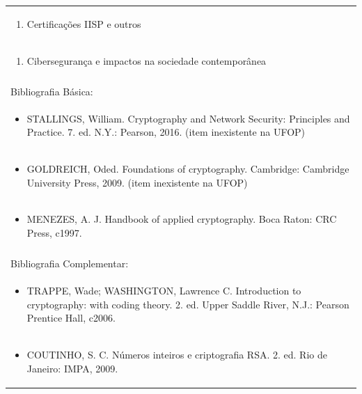 \documentclass[11pt]{article}
\begin{document}
\begin{center}
\begin{longtable}{|p{4cm}|p{4cm}|p{4cm}|p{4cm}|}
\multicolumn{4}{|p{\dimexpr 16cm + 6\tabcolsep\relax}|}{\begin{enumerate}[start=11]\item Certificações IISP e outros\end{enumerate}}\\
\multicolumn{4}{|p{\dimexpr 16cm + 6\tabcolsep\relax}|}{\begin{enumerate}[start=12]\item Cibersegurança e impactos na sociedade contemporânea\end{enumerate}}\\
\multicolumn{4}{|p{\dimexpr 16cm + 6\tabcolsep\relax}|}{}\\
\hline
\multicolumn{4}{|p{16cm}|}{Bibliografia Básica:}\\*
\multicolumn{4}{|p{\dimexpr 16cm + 6\tabcolsep\relax}|}{\begin{itemize}\item STALLINGS, William. Cryptography and Network Security: Principles and Practice. 7. ed. N.Y.: Pearson, 2016. (item inexistente na UFOP)\end{itemize}}\\
\multicolumn{4}{|p{\dimexpr 16cm + 6\tabcolsep\relax}|}{\begin{itemize}\item GOLDREICH, Oded. Foundations of cryptography. Cambridge: Cambridge University Press, 2009. (item inexistente na UFOP)\end{itemize}}\\
\multicolumn{4}{|p{\dimexpr 16cm + 6\tabcolsep\relax}|}{\begin{itemize}\item MENEZES, A. J. Handbook of applied cryptography. Boca Raton: CRC Press, c1997.\end{itemize}}\\
\multicolumn{4}{|p{16cm}|}{}\\
\hline
\multicolumn{4}{|p{16cm}|}{Bibliografia Complementar:}\\*
\multicolumn{4}{|p{\dimexpr 16cm + 6\tabcolsep\relax}|}{\begin{itemize}\item TRAPPE, Wade; WASHINGTON, Lawrence C. Introduction to cryptography: with coding theory. 2. ed. Upper Saddle River, N.J.: Pearson Prentice Hall, c2006.\end{itemize}}\\
\multicolumn{4}{|p{\dimexpr 16cm + 6\tabcolsep\relax}|}{\begin{itemize}\item COUTINHO, S. C. Números inteiros e criptografia RSA. 2. ed. Rio de Janeiro: IMPA, 2009.\end{itemize}}\\

\end{longtable}
\end{center}
\end{document}
